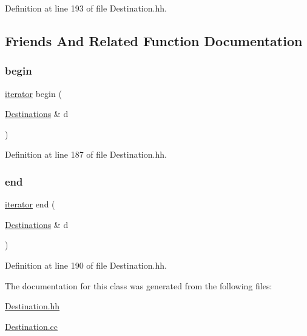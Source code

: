 Definition at line 193 of file Destination.\+hh.



\subsection{Friends And Related Function Documentation}
\mbox{\label{class_photo_finish_1_1_destinations_ade7fb31c8d1fba6dee62f77783fe6236}} 
\subsubsection{\texorpdfstring{begin}{begin}}
{\footnotesize\ttfamily \hyperlink{class_photo_finish_1_1_destinations_adb2cf9240b0d2545643caa2c1d718913}{iterator} begin (\begin{DoxyParamCaption}\item[{\hyperlink{class_photo_finish_1_1_destinations}{Destinations} \&}]{d }\end{DoxyParamCaption})\hspace{0.3cm}{\ttfamily [friend]}}



Definition at line 187 of file Destination.\+hh.

\mbox{\label{class_photo_finish_1_1_destinations_aa5c17bba7272204d0d3ae7a116feaec2}} 
\subsubsection{\texorpdfstring{end}{end}}
{\footnotesize\ttfamily \hyperlink{class_photo_finish_1_1_destinations_adb2cf9240b0d2545643caa2c1d718913}{iterator} end (\begin{DoxyParamCaption}\item[{\hyperlink{class_photo_finish_1_1_destinations}{Destinations} \&}]{d }\end{DoxyParamCaption})\hspace{0.3cm}{\ttfamily [friend]}}



Definition at line 190 of file Destination.\+hh.



The documentation for this class was generated from the following files\+:\begin{DoxyCompactItemize}
\item 
\hyperlink{_destination_8hh}{Destination.\+hh}\item 
\hyperlink{_destination_8cc}{Destination.\+cc}\end{DoxyCompactItemize}
